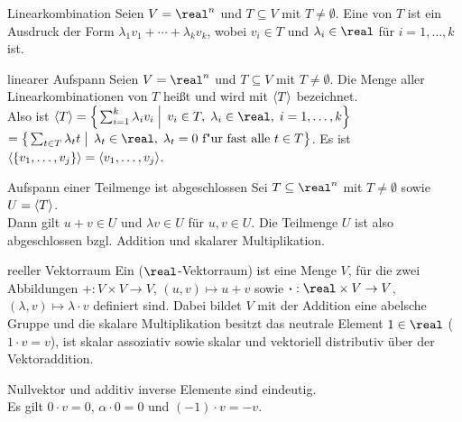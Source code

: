 \begin{Def}{Linearkombination}
    Seien $V = \real^n$ und $T \subseteq V$ mit $T \not= \emptyset$.
    Eine  von $T$ ist ein Ausdruck der Form
    $\lambda_1 v_1 + \cdots + \lambda_k v_k$, wobei $v_i \in T$ und
    $\lambda_i \in \real$ für $i = 1, \ldots, k$ ist.
\end{Def}

\begin{Def}{linearer Aufspann}
    Seien $V = \real^n$ und $T \subseteq V$ mit $T \not= \emptyset$.
    Die Menge aller Linearkombinationen von $T$ heißt
     und wird mit $\langle T \rangle$ bezeichnet. \\
    Also ist $\aufspann{T} = \left\{\left. \sum_{i=1}^k \lambda_i v_i
    \;\right|\; v_i \in T,\; \lambda_i \in \real,\;
    i = 1, \ldots, k \right\}$ \\
    $= \left\{\left. \sum_{t \in T} \lambda_t t
    \;\right|\; \lambda_t \in \real,\;
    \lambda_t = 0 \text{ f"ur fast alle } t \in T \right\}$. \qquad
    Es ist $\langle \{v_1, \ldots, v_j\} \rangle = \langle v_1, \ldots, v_j \rangle$.
\end{Def}

\begin{Satz}{Aufspann einer Teilmenge ist abgeschlossen}
    Sei $T \subseteq \real^n$ mit $T \not= \emptyset$ sowie
    $U = \langle T \rangle$. \\
    Dann gilt $u + v \in U$ und $\lambda v \in U$ für $u, v \in U$.
    Die Teilmenge $U$ ist also abgeschlossen bzgl. Addition und skalarer
    Multiplikation.
\end{Satz}

\begin{Def}{reeller Vektorraum}
    Ein  ($\real$-Vektorraum) ist eine Menge $V$,
    für die zwei Abbildungen
    $\boldsymbol{+}: V \times V \rightarrow V$, $(u, v) \mapsto u + v$ sowie
    $\boldsymbol{\cdot}: \real \times V \rightarrow V$,
    $(\lambda, v) \mapsto \lambda \cdot v$ definiert sind.
    Dabei bildet $V$ mit der Addition eine abelsche Gruppe und
    die skalare Multiplikation besitzt das neutrale Element $1 \in \real$
    ($1 \cdot v = v$), ist skalar assoziativ sowie skalar und vektoriell
    distributiv über der Vektoraddition.
\end{Def}

\begin{Kor}
    Nullvektor und additiv inverse Elemente sind eindeutig. \\
    Es gilt $0 \cdot v = 0$, \quad
    $\alpha \cdot 0 = 0$ \quad und \quad
    $(-1) \cdot v = -v$.
\end{Kor}

